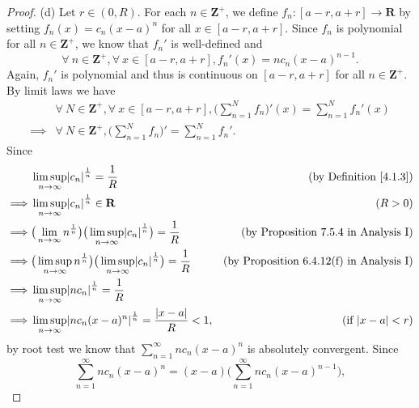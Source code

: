 \begin{proof}{(d)}
    Let \(r \in (0, R)\).
    For each \(n \in \mathbf{Z}^+\), we define \(f_n : [a - r, a + r] \to \mathbf{R}\) by setting \(f_n(x) = c_n (x - a)^n\) for all \(x \in [a - r, a + r]\).
    Since \(f_n\) is polynomial for all \(n \in \mathbf{Z}^+\), we know that \(f_n'\) is well-defined and
    \[
        \forall\ n \in \mathbf{Z}^+, \forall\ x \in [a - r, a + r], f_n'(x) = n c_n (x - a)^{n - 1}.
    \]
    Again, \(f_n'\) is polynomial and thus is continuous on \([a - r, a + r]\) for all \(n \in \mathbf{Z}^+\).
    By limit laws we have
    \begin{align*}
                 & \forall\ N \in \mathbf{Z}^+, \forall\ x \in [a - r, a + r], \bigg(\sum_{n = 1}^N f_n\bigg)'(x) = \sum_{n = 1}^N f_n'(x) \\
        \implies & \forall\ N \in \mathbf{Z}^+, \bigg(\sum_{n = 1}^N f_n\bigg)' = \sum_{n = 1}^N f_n'.
    \end{align*}
    Since
    \begin{align*}
                 & \limsup_{n \to \infty} \abs*{c_n}^{\frac{1}{n}} = \frac{1}{R}                                                            & \text{(by Definition \ref{4.1.3})}              \\
        \implies & \limsup_{n \to \infty} \abs*{c_n}^{\frac{1}{n}} \in \mathbf{R}                                                           & (R > 0)                                         \\
        \implies & \big(\lim_{n \to \infty} n^{\frac{1}{n}}\big) \big(\limsup_{n \to \infty} \abs*{c_n}^{\frac{1}{n}}\big) = \frac{1}{R}    & \text{(by Proposition 7.5.4 in Analysis I)}     \\
        \implies & \big(\limsup_{n \to \infty} n^{\frac{1}{n}}\big) \big(\limsup_{n \to \infty} \abs*{c_n}^{\frac{1}{n}}\big) = \frac{1}{R} & \text{(by Proposition 6.4.12(f) in Analysis I)} \\
        \implies & \limsup_{n \to \infty} \abs*{n c_n}^{\frac{1}{n}} = \frac{1}{R}                                                                                                            \\
        \implies & \limsup_{n \to \infty} \abs*{n c_n (x - a)^n}^{\frac{1}{n}} = \frac{\abs*{x - a}}{R} < 1,                                & \text{(if \(\abs*{x - a} < r\))}
    \end{align*}
    by root test we know that \(\sum_{n = 1}^\infty n c_n (x - a)^n\) is absolutely convergent.
    Since
    \[
        \sum_{n = 1}^\infty n c_n (x - a)^n = (x - a) \bigg(\sum_{n = 1}^\infty n c_n (x - a)^{n - 1}\bigg),
\]
\end{proof}
